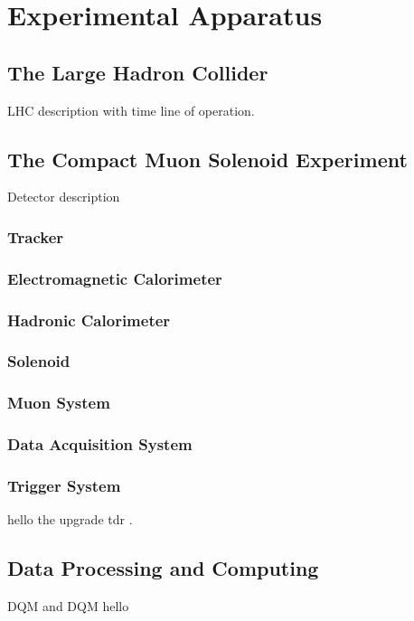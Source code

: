 \chapter{Experimental Apparatus}

\section{The Large Hadron Collider}

LHC description with time line of operation.

\section{The Compact Muon Solenoid Experiment}

Detector description

\subsection{Tracker}

\subsection{Electromagnetic Calorimeter}

\subsection{Hadronic Calorimeter}

\subsection{Solenoid}

\subsection{Muon System}

\subsection{Data Acquisition System}

\subsection{Trigger System}

hello the upgrade tdr \cite{CMSL1UpgradeTDR}.

\section{Data Processing and Computing}

 \gls{DQM} and \gls{DQM} 
hello